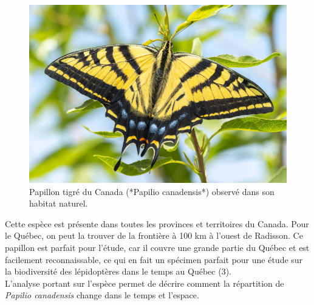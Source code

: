 \documentclass[9pt,twocolumn,twoside,]{pnas-new}
\begin{document}
\begin{figure}

{\centering \includegraphics[width=0.8\linewidth]{Papilio_canadensis} 

}

\caption{Papillon tigré du Canada (*Papilio canadensis*) observé dans son habitat naturel.}\label{fig:fig-papilio}
\end{figure}

Cette espèce est présente dans toutes les provinces et territoires du
Canada. Pour le Québec, on peut la trouver de la frontière à 100 km à
l'ouest de Radisson. Ce papillon est parfait pour l'étude, car il couvre
une grande partie du Québec et est facilement reconnaissable, ce qui en
fait un spécimen parfait pour une étude sur la biodiversité des
lépidoptères dans le temps au Québec (3).\\
L'analyse portant sur l'espèce permet de décrire comment la répartition
de \emph{Papilio canadensis} change dans le temps et l'espace.
\end{document}

